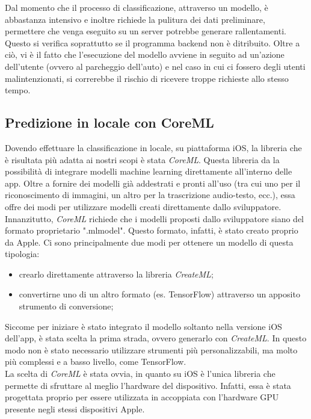 Dal momento che il processo di classificazione, attraverso un modello, è 
abbastanza intensivo e inoltre richiede la pulitura dei dati preliminare,
permettere che venga eseguito su un server potrebbe generare rallentamenti.
Questo si verifica soprattutto se il programma backend non è ditribuito.
Oltre a ciò, vi è il fatto che l'esecuzione del modello avviene in seguito
ad un'azione dell'utente (ovvero al parcheggio dell'auto) e nel caso in cui 
ci fossero degli utenti malintenzionati, si correrebbe il rischio di
ricevere troppe richieste allo stesso tempo.

\subsection{Predizione in locale con CoreML}

Dovendo effettuare la classificazione in locale, su piattaforma iOS, la 
libreria che è risultata più adatta ai nostri scopi è stata \emph{CoreML}.
Questa libreria da la possibilità di integrare modelli machine learning 
direttamente all'interno delle app. Oltre a fornire dei modelli già 
addestrati e pronti all'uso (tra cui uno per il riconoscimento di immagini,
un altro per la trascrizione audio-testo, ecc.), essa offre dei modi per 
utilizzare modelli creati direttamente dallo sviluppatore.\\
Innanzitutto, \emph{CoreML} richiede che i modelli proposti dallo
sviluppatore siano del formato proprietario ".mlmodel". Questo formato,
infatti, è stato creato proprio da Apple. Ci sono principalmente due 
modi per ottenere un modello di questa tipologia:
\begin{itemize}
    \item crearlo direttamente attraverso la libreria \emph{CreateML};
    \item convertirne uno di un altro formato (es. TensorFlow) attraverso 
    un apposito strumento di conversione;
\end{itemize}
Siccome per iniziare è stato integrato il modello soltanto nella versione
iOS dell'app, è stata scelta la prima strada, ovvero generarlo con
\emph{CreateML}. In questo modo non è stato necessario utilizzare
strumenti più personalizzabili, ma molto più complessi e a basso
livello, come TensorFlow.\\
La scelta di \emph{CoreML} è stata ovvia, in quanto su iOS è l'unica
libreria che permette di sfruttare al meglio l'hardware del dispositivo.
Infatti, essa è stata progettata proprio per essere utilizzata in
accoppiata con l'hardware GPU presente negli stessi dispositivi Apple.
